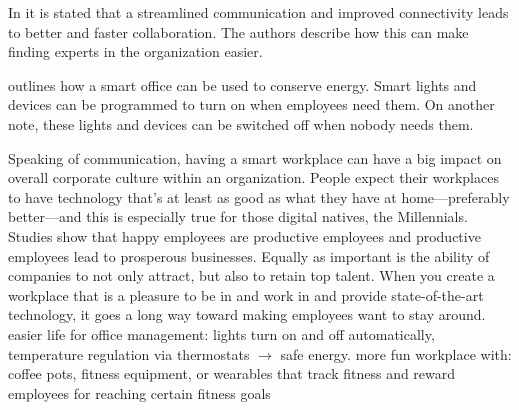 In \cite{hbcommunications} it is stated that a streamlined communication and improved connectivity leads to better and faster collaboration. The authors describe how this can make finding experts in the organization easier.


\cite{hbcommunications} outlines how a smart office can be used to conserve energy. Smart lights and devices can be programmed to turn on when employees need them. On another note, these lights and devices can be switched off when nobody needs them.

Speaking of communication, having a smart workplace can have a big impact on overall corporate culture within an organization. People expect their workplaces to have technology that’s at least as good as what they have at home—preferably better—and this is especially true for those digital natives, the Millennials. Studies show that happy employees are productive employees and productive employees lead to prosperous businesses. Equally as important is the ability of companies to not only attract, but also to retain top talent. When you create a workplace that is a pleasure to be in and work in and provide state-of-the-art technology, it goes a long way toward making employees want to stay around. easier life for office management: lights turn on and off automatically, temperature regulation via thermostats \(\rightarrow\) safe energy. more fun workplace with: coffee pots, fitness equipment, or wearables that track fitness and reward employees for
reaching certain fitness goals\cite{hbcommunications}


